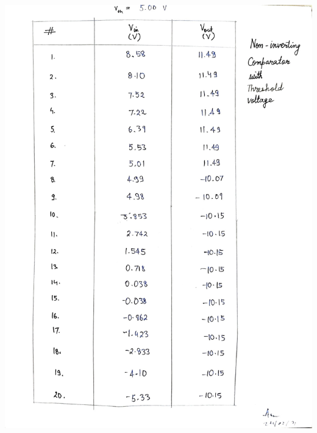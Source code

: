 \begin{center}
    \includegraphics[scale = 0.28]{OPAMP Apps/noinvcompthres.jpg}
\end{center}
\clearpage
